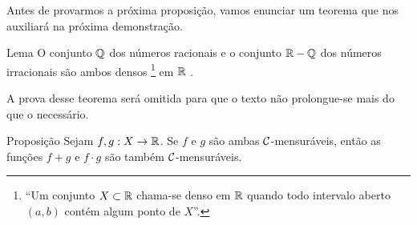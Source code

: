 Antes de provarmos a próxima proposição, vamos enunciar um teorema que nos auxiliará na próxima demonstração. 
\begin{env}{Lema}
	\label{lem:densidade de Q em R}
	O conjunto $\operatorname{\mathbb{Q}}$ dos números racionais e o conjunto
	$\mathbb{R} - \operatorname{\mathbb{Q}}$ dos números irracionais são ambos densos
	\footnote{
		\enquote{Um conjunto $X \subset \mathbb{R}$ chama-se denso em $\mathbb{R}$ quando todo
			intervalo aberto $(a, b)$ contém algum ponto de $X$}\cite[p.83]{elon}.}
	 em $\mathbb{R}$ \cite[p.84]{elon}.
	\vspace{-0.2cm}
\end{env}
A prova desse teorema será omitida para que o texto não prolongue-se mais do que o necessário.
\begin{env}{Proposição}
\label{prop:aritmetica-duas-funcoes}
    Sejam $f,g:X \to \mathbb{R}$. Se $f$ e $g$ são ambas $\operatorname{\mathcal{C}}$-mensuráveis, então as funções $f+g$ e $f\cdot g$ são também $\operatorname{\mathcal{C}}$-mensuráveis.
    \vspace{-0.2cm}
\end{env}
